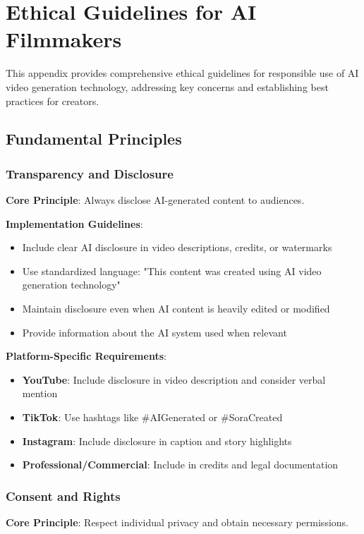 \chapter{Ethical Guidelines for AI Filmmakers}
\label{app:ethics}

This appendix provides comprehensive ethical guidelines for responsible use of AI video generation technology, addressing key concerns and establishing best practices for creators.

\section{Fundamental Principles}

\subsection{Transparency and Disclosure}
\textbf{Core Principle}: Always disclose AI-generated content to audiences.

\textbf{Implementation Guidelines}:
\begin{itemize}
\item Include clear AI disclosure in video descriptions, credits, or watermarks
\item Use standardized language: "This content was created using AI video generation technology"
\item Maintain disclosure even when AI content is heavily edited or modified
\item Provide information about the AI system used when relevant
\end{itemize}

\textbf{Platform-Specific Requirements}:
\begin{itemize}
\item \textbf{YouTube}: Include disclosure in video description and consider verbal mention
\item \textbf{TikTok}: Use hashtags like \#AIGenerated or \#SoraCreated
\item \textbf{Instagram}: Include disclosure in caption and story highlights
\item \textbf{Professional/Commercial}: Include in credits and legal documentation
\end{itemize}

\subsection{Consent and Rights}
\textbf{Core Principle}: Respect individual privacy and obtain necessary permissions.

